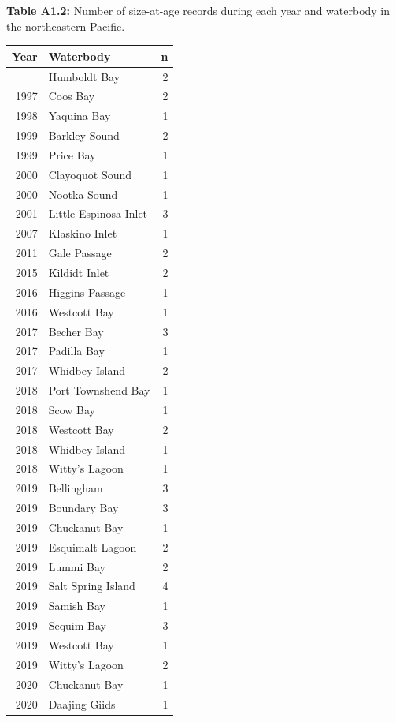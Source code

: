 \documentclass[
]{article}
\begin{document}
\textbf{Table A1.2:} Number of size-at-age records during each year and
waterbody in the northeastern Pacific.

\begin{longtable}[]{@{}rlr@{}}
\toprule\noalign{}
Year & Waterbody & n \\
\midrule\noalign{}
\endhead
\bottomrule\noalign{}
\endlastfoot
1995 & Humboldt Bay & 2 \\
1997 & Coos Bay & 2 \\
1998 & Yaquina Bay & 1 \\
1999 & Barkley Sound & 2 \\
1999 & Price Bay & 1 \\
2000 & Clayoquot Sound & 1 \\
2000 & Nootka Sound & 1 \\
2001 & Little Espinosa Inlet & 3 \\
2007 & Klaskino Inlet & 1 \\
2011 & Gale Passage & 2 \\
2015 & Kildidt Inlet & 2 \\
2016 & Higgins Passage & 1 \\
2016 & Westcott Bay & 1 \\
2017 & Becher Bay & 3 \\
2017 & Padilla Bay & 1 \\
2017 & Whidbey Island & 2 \\
2018 & Port Townshend Bay & 1 \\
2018 & Scow Bay & 1 \\
2018 & Westcott Bay & 2 \\
2018 & Whidbey Island & 1 \\
2018 & Witty's Lagoon & 1 \\
2019 & Bellingham & 3 \\
2019 & Boundary Bay & 3 \\
2019 & Chuckanut Bay & 1 \\
2019 & Esquimalt Lagoon & 2 \\
2019 & Lummi Bay & 2 \\
2019 & Salt Spring Island & 4 \\
2019 & Samish Bay & 1 \\
2019 & Sequim Bay & 3 \\
2019 & Westcott Bay & 1 \\
2019 & Witty's Lagoon & 2 \\
2020 & Chuckanut Bay & 1 \\
2020 & Daajing Giids & 1 \\
\end{longtable}
\end{document}
